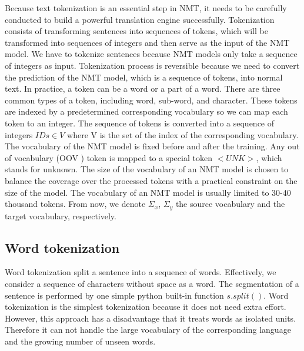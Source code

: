 Because text tokenization is an essential step in NMT, it needs to be carefully conducted to build a powerful translation engine successfully. Tokenization consists of transforming sentences into sequences of tokens, which will be transformed into sequences of integers and then serve as the input of the NMT model. We have to tokenize sentences because NMT models only take a sequence of integers as input. Tokenization process is reversible because we need to convert the prediction of the NMT model, which is a sequence of tokens, into normal text. In practice, a token can be a word or a part of a word. There are three common types of a token, including word, sub-word, and character. These tokens are indexed by a predetermined corresponding vocabulary so we can map each token to an integer. The sequence of tokens is converted into a sequence of integers $IDs \in V$ where V is the set of the index of the corresponding vocabulary. The vocabulary of the NMT model is fixed before and after the training. Any out of vocabulary (OOV ) token is mapped to a special token $<UNK>$, which stands for unknown. The size of the vocabulary of an NMT model is chosen to balance the coverage over the processed tokens with a practical constraint on the size of the model. The vocabulary of an NMT model is usually limited to 30-40 thousand tokens. From now, we denote $\Sigma_{x}$, $\Sigma_y$ the source vocabulary and the target vocabulary, respectively.    
\subsection{Word tokenization}
Word tokenization split a sentence into a sequence of words. Effectively, we consider a sequence of characters without space as a word. The segmentation of a sentence is performed by one simple python built-in function $s.split()$. Word tokenization is the simplest tokenization because it does not need extra effort. However, this approach has a disadvantage that it treats words as isolated units. Therefore it can not handle the large vocabulary of the corresponding language and the growing number of unseen words.
